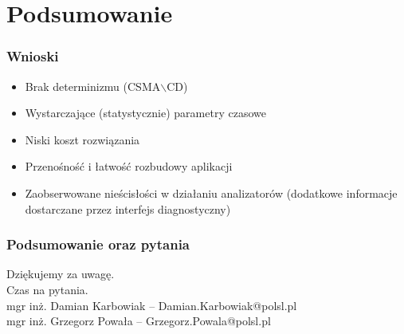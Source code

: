 \documentclass[ucs]{beamer}
\begin{document}
\section{Podsumowanie}
\begin{frame}
\frametitle{Wnioski}
\begin{itemize}
\setlength{\itemsep}{5pt}
\setlength{\parskip}{5pt}
\setlength{\parsep}{5pt}
\item Brak determinizmu (CSMA$\backslash$CD)
\item Wystarczające (statystycznie) parametry czasowe
\item Niski koszt rozwiązania
\item Przenośność i łatwość rozbudowy aplikacji
\item Zaobserwowane nieścisłości w działaniu analizatorów (dodatkowe informacje dostarczane przez interfejs diagnostyczny)
\end{itemize}
\end{frame}

\begin{frame}
\frametitle{Podsumowanie oraz pytania}
Dziękujemy za uwagę.
\\\vspace{2cm}
Czas na pytania.
\\\vspace{2cm}
mgr inż. Damian Karbowiak -- Damian.Karbowiak@polsl.pl\\
mgr inż. Grzegorz Powała  -- Grzegorz.Powala@polsl.pl
\end{frame}
\end{document}
